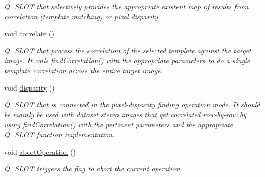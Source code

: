 \begin{DoxyCompactItemize}
\begin{DoxyCompactList}\small\item\em Q\_\-SLOT that selectively provides the appropriate existent map of results from correlation (template matching) or pixel disparity. \item\end{DoxyCompactList}\item 
\hypertarget{classQcorr_ace91b9d83b34887735737323bac5431e}{
void \hyperlink{classQcorr_ace91b9d83b34887735737323bac5431e}{correlate} ()}
\label{classQcorr_ace91b9d83b34887735737323bac5431e}

\begin{DoxyCompactList}\small\item\em Q\_\-SLOT that process the correlation of the selected template against the target image. It calls findCorrelation() with the appropriate parameters to do a single template correlation across the entire target image. \item\end{DoxyCompactList}\item 
\hypertarget{classQcorr_a640ee4c76350e5886deddbf4f0d50594}{
void \hyperlink{classQcorr_a640ee4c76350e5886deddbf4f0d50594}{disparity} ()}
\label{classQcorr_a640ee4c76350e5886deddbf4f0d50594}

\begin{DoxyCompactList}\small\item\em Q\_\-SLOT that is connected in the pixel-\/disparity finding operation mode. It should be mainly be used with dataset stereo images that get correlated row-\/by-\/row by using findCorrelation() with the pertinent parameters and the appropriate Q\_\-SLOT function implementation. \item\end{DoxyCompactList}\item 
\hypertarget{classQcorr_ad6e0fb9461faffd01afbf62e1a0be4c3}{
void \hyperlink{classQcorr_ad6e0fb9461faffd01afbf62e1a0be4c3}{abortOperation} ()}
\label{classQcorr_ad6e0fb9461faffd01afbf62e1a0be4c3}

\begin{DoxyCompactList}\small\item\em Q\_\-SLOT triggers the flag to abort the current operation. \item\end{DoxyCompactList}\end{DoxyCompactItemize}
